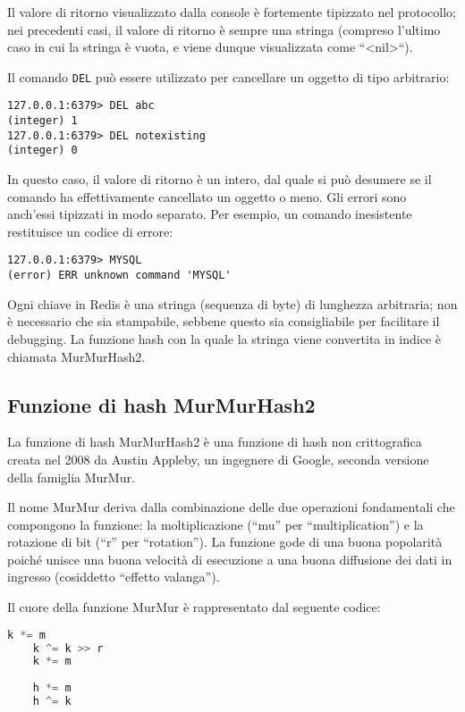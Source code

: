 Il valore di ritorno visualizzato dalla console è fortemente tipizzato nel protocollo;
nei precedenti casi, il valore di ritorno è sempre una stringa (compreso l'ultimo
caso in cui la stringa è vuota, e viene dunque visualizzata come ``<nil>``).

Il comando \verb|DEL| può essere utilizzato per cancellare un oggetto di tipo
arbitrario:

\medskip
\begin{lstlisting}
127.0.0.1:6379> DEL abc
(integer) 1
127.0.0.1:6379> DEL notexisting
(integer) 0
\end{lstlisting}

In questo caso, il valore di ritorno è un intero, dal quale si può desumere se il comando
ha effettivamente cancellato un oggetto o meno. Gli errori sono anch'essi tipizzati in
modo separato. Per esempio, un comando inesistente restituisce un codice di errore:

\medskip
\begin{lstlisting}
127.0.0.1:6379> MYSQL
(error) ERR unknown command 'MYSQL'
\end{lstlisting}

Ogni chiave in Redis è una stringa (sequenza di byte) di lunghezza arbitraria; non è
necessario che sia stampabile, sebbene questo sia consigliabile per facilitare il
debugging. La funzione hash con la quale la stringa viene convertita in indice è
chiamata MurMurHash2.

\subsection{Funzione di hash MurMurHash2}

La funzione di hash MurMurHash2 \cite{murmur2} è una funzione di hash non crittografica creata nel
2008 da  Austin Appleby, un ingegnere di Google, seconda versione della famiglia MurMur.

Il nome MurMur deriva dalla combinazione delle due operazioni fondamentali che compongono la
funzione: la moltiplicazione (``mu'' per ``multiplication'') e la rotazione di bit (``r'' per
``rotation''). La funzione gode di una buona popolarità poiché unisce una buona velocità di
esecuzione a una buona diffusione dei dati in ingresso (cosiddetto ``effetto valanga'').

Il cuore della funzione MurMur è rappresentato dal seguente codice:

\medskip
\begin{lstlisting}[language=C]
	k *= m
	k ^= k >> r
	k *= m
	
	h *= m
	h ^= k
\end{lstlisting}


